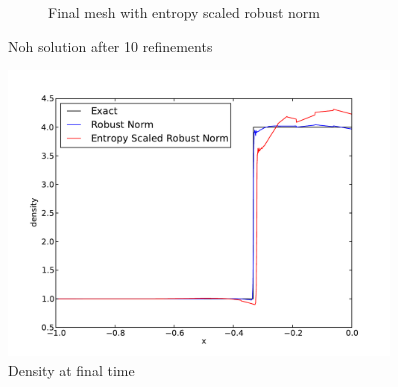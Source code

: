 \documentclass[Dissertation.tex]{subfiles}
\begin{document}
\begin{figure}[ht]
\begin{subfigure}[t]{0.45\textwidth}
\caption{Final mesh with entropy scaled robust norm}
\end{subfigure}
\caption{Noh solution after 10 refinements}
\label{fig:NohEntropyComparison}
\end{figure}

\begin{figure}[ht]
\centering
\includegraphics[width=0.9\textwidth]{Dissertation/Noh/EntropyNormComparison.pdf}
\caption{Density at final time}
\label{fig:NohEntropyComparison2}
\end{figure}
\end{document}
